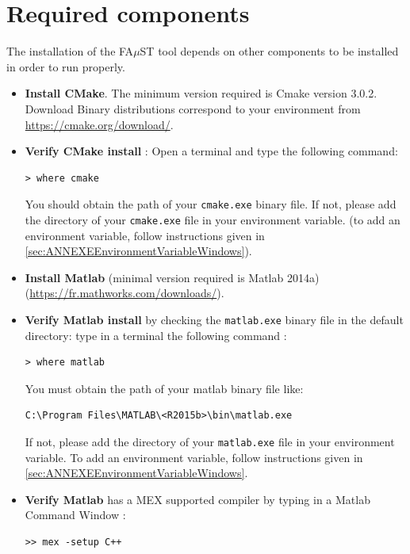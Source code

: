 \section{Required components}\label{sec:WinRequired}
The installation of the FA$\mu$ST tool depends on other components to be installed in order to run properly. 

\begin{itemize}
\item \textbf{Install CMake}. The minimum version required is Cmake version 3.0.2. Download Binary distributions correspond to your environment from \url{https://cmake.org/download/}.
\item \textbf{Verify CMake install} : Open a terminal and type the following command:
\lstset{style=customBash}
\begin{lstlisting}
> where cmake
\end{lstlisting}
You should obtain the path of your \texttt{cmake.exe} binary file. If not, please add the directory of your \texttt{cmake.exe} file in your environment variable. (to add an environment variable, follow instructions given in \ref{sec:ANNEXEEnvironmentVariableWindows}). 

\item \textbf{Install Matlab} (minimal version required is Matlab 2014a) (\url{https://fr.mathworks.com/downloads/}). 

\item \textbf{Verify Matlab install} by checking the \texttt{matlab.exe} binary file in the default directory:  type in a terminal the following command : 
\lstset{style=customBash}
\begin{lstlisting}
> where matlab
\end{lstlisting}
You must obtain the path of your matlab binary file like: 
\begin{lstlisting}
C:\Program Files\MATLAB\<R2015b>\bin\matlab.exe
\end{lstlisting}
If not, please add the directory of your \texttt{matlab.exe} file in your environment variable. To add an environment variable, follow instructions given in \ref{sec:ANNEXEEnvironmentVariableWindows}.\\

\item \textbf{Verify Matlab} has a MEX supported compiler by typing in a Matlab Command Window :
\lstset{style=customMatlab}
\begin{lstlisting}
>> mex -setup C++
\end{lstlisting}


\end{itemize}
